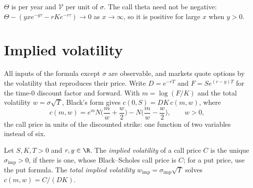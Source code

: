 $\Theta$ is per year and $\mathcal V$ per unit of $\sigma$. The call theta need not be negative:
$\Theta-(yxe^{-y\tau}-rKe^{-r\tau})\to0$ as $x\to\infty$, so it is positive for large $x$ when $y>0$.


\section{Implied volatility}\label{sec:bsf-implied-vol}

All inputs of the formula except $\sigma$ are observable, and markets quote options by the volatility that
reproduces their price. Write $D=e^{-rT}$ and
$F=Se^{(r-y)T}$ for the time-$0$ discount factor and forward. With $m=\log(F/K)$ and the total volatility
$w=\sigma\sqrt T$, Black's form gives $c(0,S)=DK\,c(m,w)$, where
\begin{equation}\label{eq:bsf-normalised}
  c(m,w)=e^mN\Big(\frac mw+\frac w2\Big)-N\Big(\frac mw-\frac w2\Big),\qquad w>0,
\end{equation}
the call price in units of the discounted strike: one function of two variables instead of six.

\begin{definition}\label{def:bsf-implied-vol}
Let $S,K,T>0$ and $r,y\in\R$. The \emph{implied volatility} of a call price $C$ is the unique
$\sigma_{\mathrm{imp}}>0$, if there is one, whose Black--Scholes call price is $C$; for a put price, use the put
formula. The \emph{total implied volatility} $w_{\mathrm{imp}}=\sigma_{\mathrm{imp}}\sqrt T$ solves $c(m,w)=C/(DK)$.
\end{definition}

